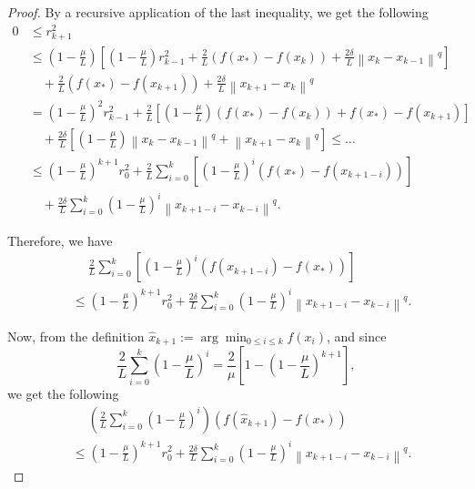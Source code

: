\documentclass[11pt]{amsart}
\theoremstyle{definition}
\numberwithin{equation}{section}
\begin{document}
\begin{proof}
By a recursive application of the last inequality, we get the following
\begin{align*}
    0 & \leq r_{k+1}^2 \\&
    \leq \left( 1 - \frac{\mu}{L}\right) \left[  \left( 1 - \frac{\mu}{L}\right) r_{k-1}^2 + \frac{2}{L} \left(f(x_*) - f\left(x_{k}\right) \right) + \frac{2\delta }{L}   \left\|x_{k} - x_{k-1} \right\|^q \right] 
    \\& \quad +\frac{2}{L} \left(f(x_*) - f\left(x_{k+1}\right) \right)  + \frac{2\delta }{L}   \left\|x_{k+1} - x_k \right\|^q 
    \\& = \left( 1 - \frac{\mu}{L}\right)^2 r_{k-1}^2 + \frac{2}{L} \left[ \left(1- \frac{\mu}{L}\right) \left(f(x_*) - f\left(x_{k}\right) \right) + f(x_*) - f\left(x_{k+1}\right)   \right] 
    \\& \quad + \frac{2\delta}{L} \left[\left(1- \frac{\mu}{L}\right) \left\|x_{k} - x_{k-1}\right \|^q + \left\|x_{k+1} - x_k\right \|^q  \right]
     \leq \ldots
     \\& \leq  \left( 1 - \frac{\mu}{L}\right)^{k+1} r_{0}^2 + \frac{2}{L} \sum_{i = 0}^{k}  \left[\left(1- \frac{\mu}{L}\right)^i \left(f(x_*) - f\left(x_{k+1-i}\right) \right) \right]
     \\& \quad + \frac{2\delta}{L} \sum_{i = 0}^{k} \left(1- \frac{\mu}{L}\right)^i\left \|x_{k+1-i} - x_{k-i}\right \|^q .
\end{align*}

Therefore, we have
\begin{align*}
    & \quad \; \frac{2}{L} \sum_{i = 0}^{k} \left[ \left(1- \frac{\mu}{L}\right)^i\left( f\left(x_{k+1-i}\right) - f(x_*) \right)   \right] 
    \\& \leq \left( 1 - \frac{\mu}{L}\right)^{k+1} r_{0}^2+  \frac{2\delta}{L} \sum_{i = 0}^{k} \left(1- \frac{\mu}{L}\right)^i \left\|x_{k+1-i} - x_{k-i}\right \|^q .  
\end{align*}

Now, from the definition $\widehat{x}_{k+1} := \arg\min_{0 \leq i \leq k} f(x_i)$, and since
$$
\frac{2}{L} \sum_{i = 0}^{k} \left(1- \frac{\mu}{L}\right)^i = \frac{2}{\mu} \left[ 1 -\left(1- \frac{\mu}{L}\right)^{k+1} \right],
$$
we get the following 
\begin{align*}
    & \quad \; \left(\frac{2}{L} \sum_{i = 0}^{k} \left(1- \frac{\mu}{L}\right)^i\right) \left(f\left(\widehat{x}_{k+1}\right) - f(x_*)\right) 
    \\& \leq  \left( 1 - \frac{\mu}{L}\right)^{k+1} r_{0}^2 +  \frac{2\delta}{L} \sum_{i = 0}^{k} \left(1- \frac{\mu}{L}\right)^i \left\|x_{k+1-i} - x_{k-i}\right \|^q .
\end{align*}


\end{proof}
\end{document}
